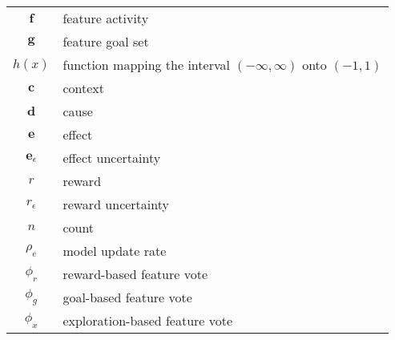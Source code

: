 \begin{table}[htdp]
\begin{center}
\begin{tabular}{|c|l|}
$\mathbf{f}$ & feature activity \\
$\mathbf{g}$ & feature goal set\\
$h(x)$ & function mapping the interval $(-\infty, \infty)$ onto $(-1, 1)$ \\
$\mathbf{c}$ & context \\
$\mathbf{d}$ & cause \\
$\mathbf{e}$ & effect \\
$\mathbf{e}_\epsilon$ & effect uncertainty\\
$r$ & reward \\
$r_\epsilon$ & reward uncertainty \\
$n$ & count \\
$\rho_e$ & model update rate \\
$\phi_r$ & reward-based feature vote \\
$\phi_g$ & goal-based feature vote \\
$\phi_x$ & exploration-based feature vote \\
\hline
\end{tabular}
\end{center}
\label{table:notation}
\end{table}%
